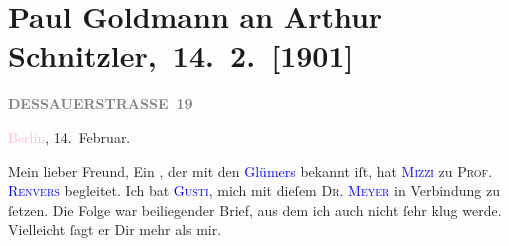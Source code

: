 

\renewcommand{\erwaehntePersonen}{Personen: Marie Glümer, Auguste Glümer,  Meyer, Rudolf Renvers}
\renewcommand{\erwaehnteOrte}{Orte: Berlin, Dessauer Straße, Wien}
\renewcommand{\erwaehnteWerke}{}
\section[ Paul Goldmann an Arthur Schnitzler, 14. 2. {[}1901{]}]{Paul Goldmann an Arthur Schnitzler, 14. 2. {[}1901{]}}
\nopagebreak{}
\rehead{ }\normalsize\beginnumbering{}
\toendnotes[C]{\smallbreak\pagebreak[2]}
\toendnotes[C]{\smallbreak}
\pstart
           \noindent{}\raggedleft{}{\pb}\textcolor{pink}{\textcolor{gray}{\textbf{DESSAUERSTRASSE 19}}}{}\ledrightnote{\textcolor{pink}{Dessauer Straße}}\pend
           
\pstart
           \textcolor{pink}{Berlin}{}\ledrightnote{\textcolor{pink}{Berlin}}, 14. Februar.\pend
           
\pstart\center{}Mein lieber Freund,\pend
\pstart
           Ein \label{K_L03058-1v}\label{K_L03058-1h}, der mit den \textcolor{blue}{Glümers}{}\ledrightnote{{$\rightarrow$}\textcolor{blue}{Marie Glümer}{\newline}{$\rightarrow$}\textcolor{blue}{Auguste Glümer}} bekannt
               iſt, hat \textsc{\textcolor{blue}{Mizzi}{}\ledrightnote{\textcolor{blue}{Marie Glümer}}} zu 
               \textsc{Prof. \textcolor{blue}{Renvers}{}\ledrightnote{\textcolor{blue}{Rudolf Renvers}}}
                begleitet. Ich
               bat \textsc{\textcolor{blue}{Gusti}{}\ledrightnote{\textcolor{blue}{Auguste Glümer}}}, mich mit dieſem \textsc{Dr. \textcolor{blue}{Meyer}{}\ledrightnote{\textcolor{blue}{Meyer}}} in Verbindung zu ſetzen. Die Folge war
               beiliegender Brief, aus dem ich auch nicht ſehr klug werde. Vielleicht ſagt er Dir
               mehr als mir.\pend
           
